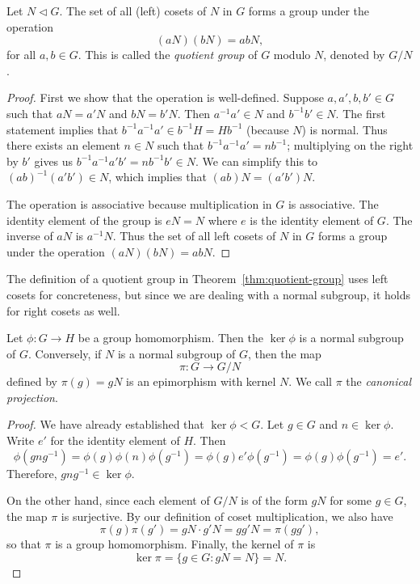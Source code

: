 \begin{theorem}
    \label{thm:quotient-group}
    Let \(N \triangleleft G\). The set of all (left) cosets of \(N\) in \(G\)
    forms a group under the operation
    \[
        (aN)(bN) = abN,
    \]
    for all \(a, b \in G\). This is called the \emph{quotient group} of \(G\)
    modulo \(N\), denoted by \(G/N\).
\end{theorem}

\begin{proof}
    First we show that the operation is well-defined. Suppose \(a, a', b, b' \in
    G\) such that \(aN = a'N\) and \(bN = b'N\). Then \(a^{-1}a' \in N\) and
    \(b^{-1}b' \in N\). The first statement implies that \(b^{-1}a^{-1}a' \in
    b^{-1}H = Hb^{-1}\) (because \(N\)) is normal. Thus there exists an element
    \(n \in N\) such that \(b^{-1}a^{-1}a' = nb^{-1}\); multiplying on the right
    by \(b'\) gives us \(b^{-1}a^{-1}a'b' = nb^{-1}b' \in N\). We can simplify
    this to \((ab)^{-1}(a'b') \in N\), which implies that \((ab)N = (a'b')N\).

    The operation is associative because multiplication in \(G\) is associative.
    The identity element of the group is \(eN = N\) where \(e\) is the identity
    element of \(G\). The inverse of \(aN\) is \(a^{-1}N\). Thus the set of all
    left cosets of \(N\) in \(G\) forms a group under the operation \((aN)(bN) =
    abN\).
\end{proof}

\begin{remark}
    The definition of a quotient group in Theorem~\ref{thm:quotient-group} uses
    left cosets for concreteness, but since we are dealing with a normal
    subgroup, it holds for right cosets as well.
\end{remark}

\begin{theorem}
    Let \(\phi : G \to H\) be a group homomorphism. Then the \(\ker \phi\) is a
    normal subgroup of \(G\). Conversely, if \(N\) is a normal subgroup of
    \(G\), then the map
    \[
        \pi : G \to G/N
    \]
    defined by \(\pi(g) = gN\) is an epimorphism with kernel \(N\). We call
    \(\pi\) the \emph{canonical projection}.
\end{theorem}

\begin{proof}
    We have already established that \(\ker \phi < G\). Let \(g \in G\) and \(n
    \in \ker \phi\). Write \(e'\) for the identity element of \(H\). Then
    \[
        \phi(gng^{-1}) = \phi(g)\phi(n)\phi(g^{-1}) = \phi(g)e'\phi(g^{-1}) = \phi(g)\phi(g^{-1}) = e'.
    \]
    Therefore, \(gng^{-1} \in \ker \phi\).

    On the other hand, since each element of \(G/N\) is of the form \(gN\) for
    some \(g \in G\), the map \(\pi\) is surjective. By our definition of coset
    multiplication, we also have
    \[
        \pi(g)\pi(g') = gN \cdot g'N = gg'N = \pi(gg'),
    \]
    so that \(\pi\) is a group homomorphism. Finally, the kernel of \(\pi\) is
    \[
        \ker \pi = \{g \in G : gN = N\} = N.
    \]
\end{proof}

